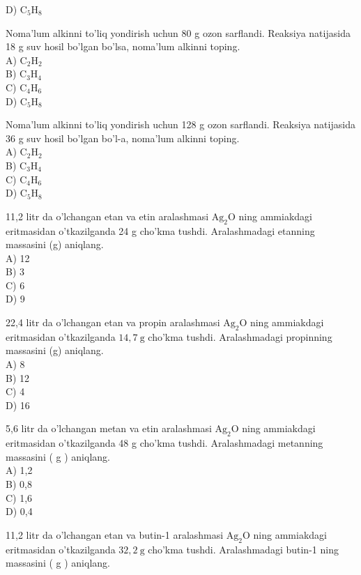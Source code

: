 D) $\mathrm{C}_{5} \mathrm{H}_{8}$
  \item Noma'lum alkinni to'liq yondirish uchun 80 g ozon sarflandi. Reaksiya natijasida 18 g suv hosil bo'lgan bo'lsa, noma'lum alkinni toping.\\
A) $\mathrm{C}_{2} \mathrm{H}_{2}$\\
B) $\mathrm{C}_{3} \mathrm{H}_{4}$\\
C) $\mathrm{C}_{4} \mathrm{H}_{6}$\\
D) $\mathrm{C}_{5} \mathrm{H}_{8}$
  \item Noma'lum alkinni to'liq yondirish uchun 128 g ozon sarflandi. Reaksiya natijasida 36 g suv hosil bo'lgan bo'l-a, noma'lum alkinni toping.\\
A) $\mathrm{C}_{2} \mathrm{H}_{2}$\\
B) $\mathrm{C}_{3} \mathrm{H}_{4}$\\
C) $\mathrm{C}_{4} \mathrm{H}_{6}$\\
D) $\mathrm{C}_{5} \mathrm{H}_{8}$
  \item 11,2 litr da o'lchangan etan va etin aralashmasi $\mathrm{Ag}_{2} \mathrm{O}$ ning ammiakdagi eritmasidan o'tkazilganda 24 g cho'kma tushdi. Aralashmadagi etanning massasini (g) aniqlang.\\
A) 12\\
B) 3\\
C) 6\\
D) 9
  \item 22,4 litr da o'lchangan etan va propin aralashmasi $\mathrm{Ag}_{2} \mathrm{O}$ ning ammiakdagi eritmasidan o'tkazilganda $14,7 \mathrm{~g}$ cho'kma tushdi. Aralashmadagi propinning massasini (g) aniqlang.\\
A) 8\\
B) 12\\
C) 4\\
D) 16
  \item 5,6 litr da o'lchangan metan va etin aralashmasi $\mathrm{Ag}_{2} \mathrm{O}$ ning ammiakdagi eritmasidan o'tkazilganda 48 g cho'kma tushdi. Aralashmadagi metanning massasini ( g ) aniqlang.\\
A) 1,2\\
B) 0,8\\
C) 1,6\\
D) 0,4
  \item 11,2 litr da o'lchangan etan va butin-1 aralashmasi $\mathrm{Ag}_{2} \mathrm{O}$ ning ammiakdagi eritmasidan o'tkazilganda $32,2 \mathrm{~g}$ cho'kma tushdi. Aralashmadagi butin-1 ning massasini ( g ) aniqlang.\\
